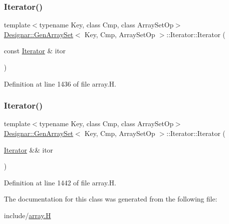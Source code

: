 \mbox{\label{class_designar_1_1_gen_array_set_1_1_iterator_a080025e4989fd5c3110e93e0c7c17fe2}} 
\subsubsection{\texorpdfstring{Iterator()}{Iterator()}\hspace{0.1cm}{\footnotesize\ttfamily [4/5]}}
{\footnotesize\ttfamily template$<$typename Key, class Cmp, class Array\+Set\+Op$>$ \\
\hyperlink{class_designar_1_1_gen_array_set}{Designar\+::\+Gen\+Array\+Set}$<$ Key, Cmp, Array\+Set\+Op $>$\+::Iterator\+::\+Iterator (\begin{DoxyParamCaption}\item[{const \hyperlink{class_designar_1_1_gen_array_set_1_1_iterator}{Iterator} \&}]{itor }\end{DoxyParamCaption})\hspace{0.3cm}{\ttfamily [inline]}}



Definition at line 1436 of file array.\+H.

\mbox{\label{class_designar_1_1_gen_array_set_1_1_iterator_aa82e1690f18b28782163e6bbb9d7d32a}} 
\subsubsection{\texorpdfstring{Iterator()}{Iterator()}\hspace{0.1cm}{\footnotesize\ttfamily [5/5]}}
{\footnotesize\ttfamily template$<$typename Key, class Cmp, class Array\+Set\+Op$>$ \\
\hyperlink{class_designar_1_1_gen_array_set}{Designar\+::\+Gen\+Array\+Set}$<$ Key, Cmp, Array\+Set\+Op $>$\+::Iterator\+::\+Iterator (\begin{DoxyParamCaption}\item[{\hyperlink{class_designar_1_1_gen_array_set_1_1_iterator}{Iterator} \&\&}]{itor }\end{DoxyParamCaption})\hspace{0.3cm}{\ttfamily [inline]}}



Definition at line 1442 of file array.\+H.



The documentation for this class was generated from the following file\+:\begin{DoxyCompactItemize}
\item 
include/\hyperlink{array_8_h}{array.\+H}\end{DoxyCompactItemize}
